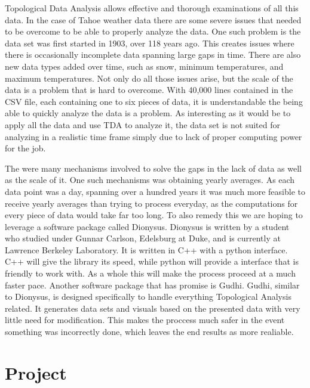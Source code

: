 \documentclass[12pt]{report}
\begin{document}
Topological Data Analysis allows effective and thorough examinations of all this data. In the case of Tahoe weather data there are some severe issues that needed to be overcome to be able to properly analyze the data. One such problem is the data set was first started in 1903, over 118 years ago. This creates issues where there is occasionally incomplete data spanning large gaps in time. There are also new data types added over time, such as snow, minimum temperatures, and maximum temperatures. Not only do all those issues arise, but the scale of the data is a problem that is hard to overcome. With 40,000 lines contained in the CSV file, each containing one to six pieces of data, it is understandable the being able to quickly analyze the data is a problem. As interesting as it would be to apply all the data and use TDA to analyze it, the data set is not suited for analyzing in a realistic time frame simply due to lack of proper computing power for the job.
    
The were many mechanisms involved to solve the gaps in the lack of data as well as the scale of it. One such mechanisms was obtaining yearly averages. As each data point was a day, spanning over a hundred years it was much more feasible to receive yearly averages than trying to process everyday, as the computations for every piece of data would take far too long. To also remedy this we are hoping to leverage a software package called Dionysus. Dionysus is written by a student who studied under Gunnar Carlson, Edelsburg at Duke, and is currently at Lawrence Berkeley Laboratory. It is written in C++ with a python interface. C++ will give the library its speed, while python will provide a interface that is friendly to work with. As a whole this will make the process proceed at a much faster pace. Another software package that has promise is Gudhi. Gudhi, similar to Dionysus, is designed specifically to handle everything Topological Analysis related. It generates data sets and visuals based on the presented data with very little need for modification. This makes the proccess much safer in the event something was incorrectly done, which leaves the end results as more realiable.


\clearpage
\section*{Project}
\end{document}
